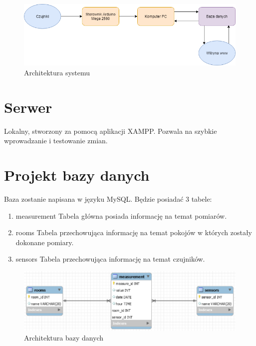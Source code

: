 \documentclass[10pt, a4paper]{article}
\begin{document}
\begin{figure}[H]
	\centering
	\includegraphics[width=1\textwidth]{figures/uml.png}
	\caption{Architektura systemu}
	\label{fig:ArchitekturaSys}
\end{figure}

\section{Serwer}
	Lokalny, stworzony za pomocą aplikacji XAMPP. Pozwala na szybkie wprowadzanie i testowanie zmian.
	
\section{Projekt bazy danych}
	Baza zostanie napisana w języku MySQL. Będzie posiadać 3 tabele:
	\begin{enumerate}
		\item measurement
		\newline
		Tabela główna posiada informację na temat pomiarów.
		
		\item rooms
		\newline
		Tabela przechowująca informację na temat pokojów w których zostały dokonane pomiary.
		
		\item sensors
		\newline
		Tabela przechowująca informację na temat czujników.
	\end{enumerate}

\begin{figure}[H]
	\centering
	\includegraphics[width=1\textwidth]{figures/diag1.png}
	\caption{Architektura bazy danych}
	\label{fig:ArchitekturaBD1}
\end{figure}
\end{document}
